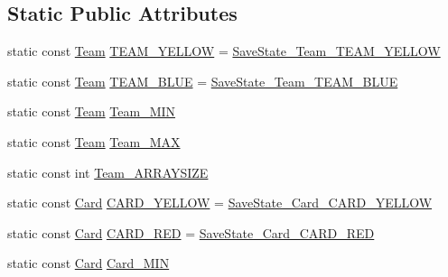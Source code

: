\subsection*{Static Public Attributes}
\begin{DoxyCompactItemize}
\item 
static const \hyperlink{savestate_8pb_8h_a4b014fc7586e8ed50211fe26dace5b8c}{Team} \hyperlink{class_save_state_a72558d895179b05de4d72e793aa61d4b}{T\-E\-A\-M\-\_\-\-Y\-E\-L\-L\-O\-W} = \hyperlink{savestate_8pb_8h_a4b014fc7586e8ed50211fe26dace5b8caf116857a1f5db3af6927846231dca291}{Save\-State\-\_\-\-Team\-\_\-\-T\-E\-A\-M\-\_\-\-Y\-E\-L\-L\-O\-W}
\item 
static const \hyperlink{savestate_8pb_8h_a4b014fc7586e8ed50211fe26dace5b8c}{Team} \hyperlink{class_save_state_adf1b7a39d63e6e33f3b6d72991c9830a}{T\-E\-A\-M\-\_\-\-B\-L\-U\-E} = \hyperlink{savestate_8pb_8h_a4b014fc7586e8ed50211fe26dace5b8ca8e18e24b9a2d6b63652871ecfd339c7f}{Save\-State\-\_\-\-Team\-\_\-\-T\-E\-A\-M\-\_\-\-B\-L\-U\-E}
\item 
static const \hyperlink{savestate_8pb_8h_a4b014fc7586e8ed50211fe26dace5b8c}{Team} \hyperlink{class_save_state_a00a41fbb76076221a5f8fb005a783c98}{Team\-\_\-\-M\-I\-N}
\item 
static const \hyperlink{savestate_8pb_8h_a4b014fc7586e8ed50211fe26dace5b8c}{Team} \hyperlink{class_save_state_a62f9cfc066b2ab0c830f2bff1a80164a}{Team\-\_\-\-M\-A\-X}
\item 
static const int \hyperlink{class_save_state_a76a00bd36df002f12b227f2cc67378f0}{Team\-\_\-\-A\-R\-R\-A\-Y\-S\-I\-Z\-E}
\item 
static const \hyperlink{savestate_8pb_8h_a3d0d776b2483d298617cad1c15956ec7}{Card} \hyperlink{class_save_state_a84a75080b197d2db26f057a9b1bcf6fa}{C\-A\-R\-D\-\_\-\-Y\-E\-L\-L\-O\-W} = \hyperlink{savestate_8pb_8h_a3d0d776b2483d298617cad1c15956ec7a6798f3fc3256bf56572c87b7d23f0339}{Save\-State\-\_\-\-Card\-\_\-\-C\-A\-R\-D\-\_\-\-Y\-E\-L\-L\-O\-W}
\item 
static const \hyperlink{savestate_8pb_8h_a3d0d776b2483d298617cad1c15956ec7}{Card} \hyperlink{class_save_state_ad5a49006bca296944d1e47866f19b563}{C\-A\-R\-D\-\_\-\-R\-E\-D} = \hyperlink{savestate_8pb_8h_a3d0d776b2483d298617cad1c15956ec7a465fa2c5cbcfa08957d831655052b6ae}{Save\-State\-\_\-\-Card\-\_\-\-C\-A\-R\-D\-\_\-\-R\-E\-D}
\item 
static const \hyperlink{savestate_8pb_8h_a3d0d776b2483d298617cad1c15956ec7}{Card} \hyperlink{class_save_state_a7e057bef2422d7071e567df68abe4df9}{Card\-\_\-\-M\-I\-N}

\end{DoxyCompactItemize}
